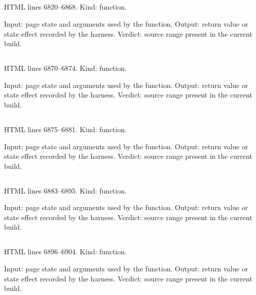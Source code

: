 \subsection*{\texttt{}}
\label{vf_327_ccZipAll}
HTML lines 6820--6868. Kind: function.

Input: page state and arguments used by the function.
Output: return value or state effect recorded by the harness.
Verdict: source range present in the current build.

\subsection*{\texttt{}}
\label{vf_328_ccHistoryJSON}
HTML lines 6870--6874. Kind: function.

Input: page state and arguments used by the function.
Output: return value or state effect recorded by the harness.
Verdict: source range present in the current build.

\subsection*{\texttt{}}
\label{vf_329_ccHistoryCSV}
HTML lines 6875--6881. Kind: function.

Input: page state and arguments used by the function.
Output: return value or state effect recorded by the harness.
Verdict: source range present in the current build.

\subsection*{\texttt{}}
\label{vf_330_ccMigrateControlKeys}
HTML lines 6883--6895. Kind: function.

Input: page state and arguments used by the function.
Output: return value or state effect recorded by the harness.
Verdict: source range present in the current build.

\subsection*{\texttt{}}
\label{vf_331_ccImport}
HTML lines 6896--6904. Kind: function.

Input: page state and arguments used by the function.
Output: return value or state effect recorded by the harness.
Verdict: source range present in the current build.

